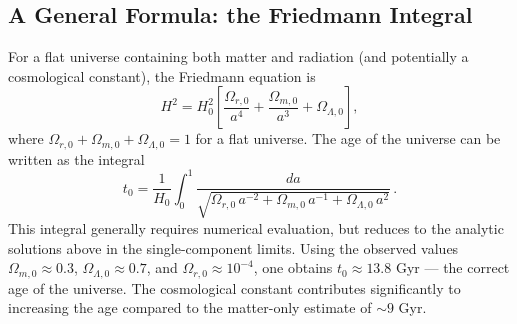 \subsection{A General Formula: the Friedmann Integral}

For a flat universe containing both matter and radiation (and potentially a cosmological constant), the Friedmann equation is
\begin{equation}
    H^2 = H_0^2\!\left[\frac{\Omega_{r,0}}{a^4} + \frac{\Omega_{m,0}}{a^3} + \Omega_{\Lambda,0}\right],
\end{equation}
where $\Omega_{r,0}+\Omega_{m,0}+\Omega_{\Lambda,0}=1$ for a flat universe. The age of the universe can be written as the integral
\begin{equation}
    t_0 = \frac{1}{H_0}\int_0^1 \frac{da}{\sqrt{\Omega_{r,0}\,a^{-2} + \Omega_{m,0}\,a^{-1} + \Omega_{\Lambda,0}\,a^2}}\,.
\end{equation}
This integral generally requires numerical evaluation, but reduces to the analytic solutions above in the single-component limits. Using the observed values $\Omega_{m,0}\approx 0.3$, $\Omega_{\Lambda,0}\approx 0.7$, and $\Omega_{r,0}\approx 10^{-4}$, one obtains $t_0\approx 13.8$ Gyr --- the correct age of the universe. The cosmological constant contributes significantly to increasing the age compared to the matter-only estimate of $\sim 9$ Gyr.

